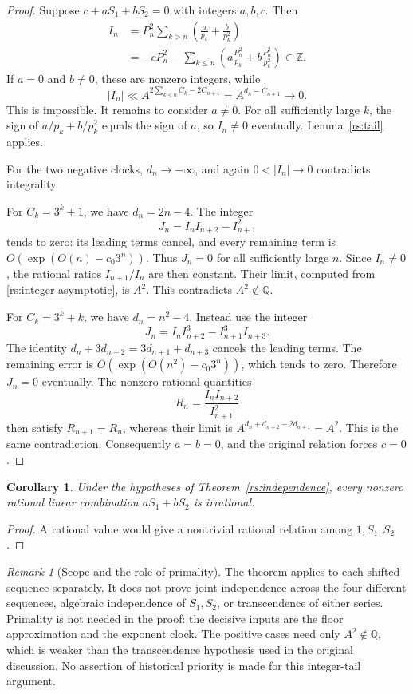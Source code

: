 \documentclass[11pt,a4paper]{article}
\numberwithin{equation}{section}
\newtheorem{corollary}[theorem]{Corollary}
\theoremstyle{definition}
\theoremstyle{remark}
\newtheorem{remark}[theorem]{Remark}
\newcommand{\Q}{\mathbb Q}
\newcommand{\Z}{\mathbb Z}
\begin{document}
\begin{proof}
Suppose $c+aS_1+bS_2=0$ with integers $a,b,c$.  Then
\begin{align*}
 I_n&=P_n^2\sum_{k>n}\left(\frac a{p_k}+\frac b{p_k^2}\right)\\
 &=-cP_n^2-\sum_{k\le n}
 \left(a\frac{P_n^2}{p_k}+b\frac{P_n^2}{p_k^2}\right)\in\Z.
\end{align*}
If $a=0$ and $b\ne0$, these are nonzero integers, while
\[
 |I_n|\ll A^{2\sum_{k\le n}C_k-2C_{n+1}}
       =A^{d_n-C_{n+1}}\longrightarrow0.
\]
This is impossible.  It remains to consider $a\ne0$.  For all sufficiently
large $k$, the sign of $a/p_k+b/p_k^2$ equals the sign of $a$, so $I_n\ne0$
eventually.  Lemma~\ref{rs:tail} applies.

For the two negative clocks, $d_n\to-\infty$, and again
$0<|I_n|\to0$ contradicts integrality.

For $C_k=3^k+1$, we have $d_n=2n-4$.  The integer
\[
 J_n=I_nI_{n+2}-I_{n+1}^2
\]
tends to zero: its leading terms cancel, and every remaining term is
$O(\exp(O(n)-c_0 3^n))$.  Thus $J_n=0$ for all sufficiently large $n$.
Since $I_n\ne0$, the rational ratios $I_{n+1}/I_n$ are then constant.
Their limit, computed from \eqref{rs:integer-asymptotic}, is $A^2$.
This contradicts $A^2\notin\Q$.

For $C_k=3^k+k$, we have $d_n=n^2-4$.  Instead use the integer
\[
 J_n=I_nI_{n+2}^3-I_{n+1}^3I_{n+3}.
\]
The identity $d_n+3d_{n+2}=3d_{n+1}+d_{n+3}$ cancels the leading terms.
The remaining error is $O(\exp(O(n^2)-c_0 3^n))$, which tends to zero.
Therefore $J_n=0$ eventually.  The nonzero rational quantities
\[
 R_n=\frac{I_nI_{n+2}}{I_{n+1}^2}
\]
then satisfy $R_{n+1}=R_n$, whereas their limit is
$A^{d_n+d_{n+2}-2d_{n+1}}=A^2$.  This is the same contradiction.
Consequently $a=b=0$, and the original relation forces $c=0$.
\end{proof}

\begin{corollary}\label{rs:irrational-combinations}
Under the hypotheses of Theorem~\ref{rs:independence}, every nonzero
rational linear combination $aS_1+bS_2$ is irrational.
\end{corollary}
\begin{proof}
A rational value would give a nontrivial rational relation among
$1,S_1,S_2$.
\end{proof}

\begin{remark}[Scope and the role of primality]\label{rs:scope}
The theorem applies to each shifted sequence separately.  It does not
prove joint independence across the four different sequences, algebraic
independence of $S_1,S_2$, or transcendence of either series.  Primality is
not needed in the proof: the decisive inputs are the floor approximation
and the exponent clock.  The positive cases need only $A^2\notin\Q$,
which is weaker than the transcendence hypothesis used in the original
discussion.  No assertion of historical priority is made for this
integer-tail argument.
\end{remark}
\end{document}

